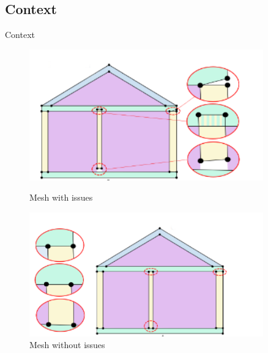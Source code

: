 \documentclass[10pt]{beamer}
\begin{document}
\subsection{Context}
\begin{frame}{Context}
\begin{figure}
    \begin{minipage}{0.45\textwidth}
    \includegraphics[width=0.9\textwidth]{../image/mesh_with_issue.png}
    \caption{Mesh with issues}
    
\end{minipage}
    \begin{minipage}{0.45\textwidth}
    \includegraphics[width=0.9\textwidth]{../image/mesh_fixed.png}
    \caption{Mesh without issues}
\end{minipage}
\end{figure}
\end{frame}
\end{document}
